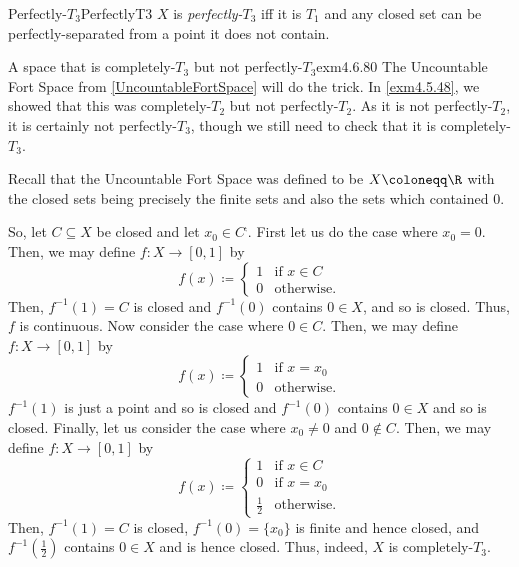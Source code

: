 \begin{dfn}{Perfectly-$T_3$}{PerfectlyT3}
$X$ is \emph{perfectly-$T_3$} iff it is $T_1$ and any closed set can be perfectly-separated from a point it does not contain.
\end{dfn}
\begin{exm}{A space that is completely-$T_3$ but not perfectly-$T_3$}{exm4.6.80}
The Uncountable Fort Space from \cref{UncountableFortSpace} will do the trick.  In \cref{exm4.5.48}, we showed that this was completely-$T_2$ but not perfectly-$T_2$.  As it is not perfectly-$T_2$, it is certainly not perfectly-$T_3$, though we still need to check that it is completely-$T_3$.

Recall that the Uncountable Fort Space was defined to be $X\coloneqq \R$ with the closed sets being precisely the finite sets and also the sets which contained $0$.

So, let $C\subseteq X$ be closed and let $x_0\in C^{\comp}$.  First let us do the case where $x_0=0$.  Then, we may define $f\colon X\rightarrow [0,1]$ by
\begin{equation}
f(x)\coloneqq \begin{cases}1 & \text{if }x\in C \\ 0 & \text{otherwise.}\end{cases}
\end{equation}
Then, $f^{-1}(1)=C$ is closed and $f^{-1}(0)$ contains $0\in X$, and so is closed.  Thus, $f$ is continuous.  Now consider the case where $0\in C$.  Then, we may define $f\colon X\rightarrow [0,1]$ by
\begin{equation}
f(x)\coloneqq \begin{cases}1 & \text{if }x=x_0 \\ 0 & \text{otherwise.}\end{cases}
\end{equation}
$f^{-1}(1)$ is just a point and so is closed and $f^{-1}(0)$ contains $0\in X$ and so is closed.  Finally, let us consider the case where $x_0\neq 0$ and $0\notin C$.  Then, we may define $f\colon X\rightarrow [0,1]$ by
\begin{equation}
f(x)\coloneqq \begin{cases}1 & \text{if }x\in C \\ 0 & \text{if }x=x_0 \\ \tfrac{1}{2} & \text{otherwise.}\end{cases}
\end{equation}
Then, $f^{-1}(1)=C$ is closed, $f^{-1}(0)=\{ x_0\}$ is finite and hence closed, and $f^{-1}(\frac{1}{2})$ contains $0\in X$ and is hence closed.  Thus, indeed, $X$ is completely-$T_3$.
\end{exm}
